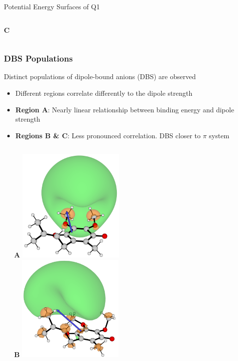\documentclass[9pt,t,xcolor=table]{beamer}
\begin{document}
\begin{frame}{\huge Potential Energy Surfaces of Q1}
\begin{columns}[t]
\begin{column}{0.50\textwidth}
\begin{columns}[b]
\begin{column}{0.3\textwidth}
					\textbf{C}
				\end{column}
			\end{columns}
		\end{column}
	\end{columns}
\end{frame}

\begin{frame}
	\frametitle{\huge DBS Populations}\large
	Distinct populations of dipole-bound anions (DBS) are observed\\
	\begin{itemize}
		\item Different regions correlate differently to the dipole strength
		\item \textbf{Region A}: Nearly linear relationship between binding energy and dipole strength
		\item \textbf{Regions B \& C}: Less pronounced correlation. DBS closer to $\pi$ system
	\end{itemize}
	\vspace{5pt}
	\begin{columns}[c]
		\begin{column}{0.62\textwidth}
			\centering
			\small	
			
		\end{column}
		\hspace{30pt}
		\begin{column}{0.3\textwidth}
			\centering
	 		\textbf{A} \includegraphics[width=0.41\textwidth]{Figs/Q1_199.png} \hfill\\
			\textbf{B} \includegraphics[width=0.41\textwidth]{Figs/Q1_249.png} \hfill

\end{column}
\end{columns}
\end{frame}
\end{document}
